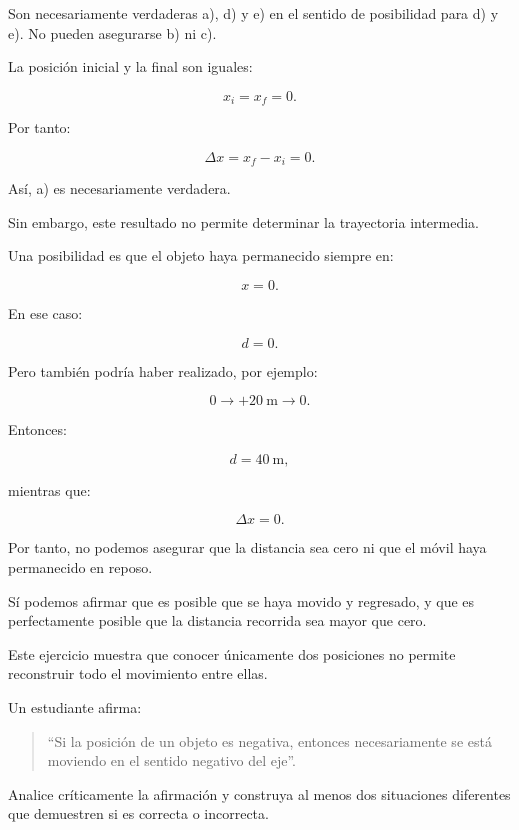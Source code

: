 \begin{respuesta}
Son necesariamente verdaderas a), d) y e) en el sentido de posibilidad para d) y e). No pueden asegurarse b) ni c).
\end{respuesta}

\begin{explicacion}
La posición inicial y la final son iguales:

\[
x_i=x_f=0.
\]

Por tanto:

\[
\Delta x=x_f-x_i=0.
\]

Así, a) es necesariamente verdadera.

Sin embargo, este resultado no permite determinar la trayectoria intermedia.

Una posibilidad es que el objeto haya permanecido siempre en:

\[ x=0. \]

En ese caso:

\[ d=0. \]

Pero también podría haber realizado, por ejemplo:

\[
0
\longrightarrow
+\SI{20}{\meter}
\longrightarrow
0.
\]

Entonces:

\[
d
=
\SI{40}{\meter},
\]

mientras que:

\[ \Delta x=0. \]

Por tanto, no podemos asegurar que la distancia sea cero ni que el móvil haya permanecido en reposo.

Sí podemos afirmar que es posible que se haya movido y regresado, y que es perfectamente posible que la distancia recorrida sea mayor que cero.

Este ejercicio muestra que conocer únicamente dos posiciones no permite reconstruir todo el movimiento entre ellas.
\end{explicacion}


\begin{ejercicio}
Un estudiante afirma:

\begin{quote}
``Si la posición de un objeto es negativa, entonces necesariamente se está moviendo en el sentido negativo del eje''.
\end{quote}

Analice críticamente la afirmación y construya al menos dos situaciones diferentes que demuestren si es correcta o incorrecta.
\end{ejercicio}

